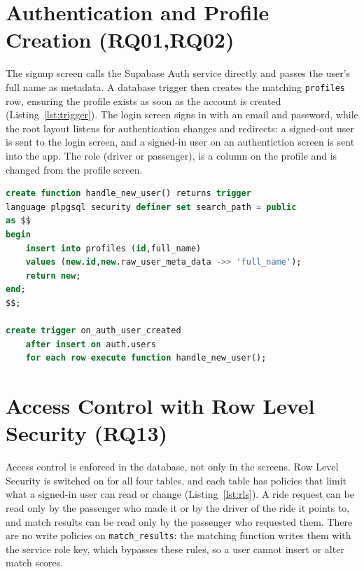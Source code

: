 \section {Authentication and Profile Creation (RQ01,RQ02)}

The signup screen calls the Supabase Auth service directly and passes the user's full name as metadata. A database trigger then creates the matching \texttt{profiles} row, ensuring the profile exists as soon as the account is created (Listing~\ref{lst:trigger}). The login screen signs in with an email and password, while the root layout listens for authentication changes and redirects: a signed-out user is sent to the login screen, and a signed-in user on an authentiction screen is sent into the app. The role (driver or passenger), is a column on the profile and is changed from the profile screen. 

\begin{lstlisting}[language=SQL, caption={Trigger that creates a profile when a user signs up},label={lst:trigger}]
create function handle_new_user() returns trigger
language plpgsql security definer set search_path = public
as $$
begin
	insert into profiles (id,full_name)
	values (new.id,new.raw_user_meta_data ->> 'full_name');
	return new;
end;
$$;

create trigger on_auth_user_created
	after insert on auth.users
	for each row execute function handle_new_user();
	\end{lstlisting}
	
\section{Access Control with Row Level Security (RQ13)}

Access control is enforced in the database, not only in the screens. Row Level Security is switched on for all four tables, and each table has policies that limit what a signed-in user can read or change (Listing~\ref{lst:rls}). A ride request can be read only by the passenger who made it or by the driver of the ride it points to, and match results can be read only by the passenger who requested them. There are no write policies on \texttt{match\_results}: the matching function writes them with the service role key, which bypasses these rules, so a user cannot insert or alter match scores.
 
